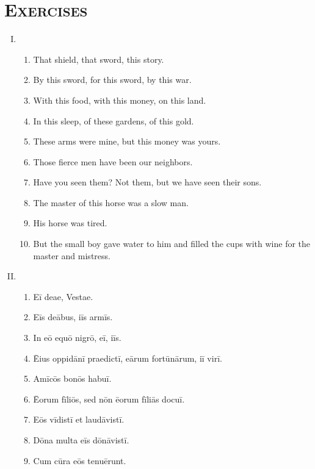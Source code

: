 \documentclass[12pt]{article}
\begin{document}
\section{\textsc{Exercises}}
\begin{enumerate}[I.]
	\setlength{\itemsep}{1em}
	\item \begin{enumerate}[1)]
		\item That shield, that sword, this story.
		\item By this sword, for this sword, by this war.
		\item With this food, with this money, on this land.
		\item In this sleep, of these gardens, of this gold.
		\item These arms were mine, but this money was yours.
		\item Those fierce men have been our neighbors.
		\item Have you seen them? Not them, but we have seen their sons.
		\item The master of this horse was a slow man.
		\item His horse was tired.
		\item But the small boy gave water to him and filled the cups with wine for the master and mistress.
	\end{enumerate}
	\item \begin{enumerate}[1)]
		\item Eī deae, Vestae.
		\item Eīs deābus, iīs armīs.
		\item In eō equō nigrō, eī, iīs.
		\item Ēius oppidānī praedictī, eārum fortūnārum, iī virī.
		\item Amīcōs bonōs habuī.
		\item Ēorum fīliōs, sed nōn ēorum fīliās docuī.
		\item Eōs vīdistī et laudāvistī.
		\item Dōna multa eīs dōnāvistī.
		\item Cum cūra eōs tenuērunt.
	\end{enumerate}
\end{enumerate}
\end{document}
